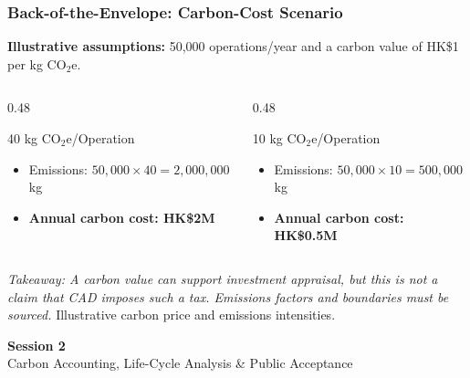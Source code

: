 \documentclass{beamer}
\begin{document}
\begin{frame}[t,shrink=11]
\frametitle{Back-of-the-Envelope: Carbon-Cost Scenario}
\textbf{Illustrative assumptions:} 50,000 operations/year and a carbon value of HK\$1 per kg $\mathrm{CO_2e}$.
\begin{columns}[T]
\begin{column}{0.48\textwidth}\begin{block}{40 kg $\mathrm{CO_2e}$/Operation}
\begin{itemize}
\item Emissions: $50{,}000\times40=2{,}000{,}000$ kg
\item \textbf{Annual carbon cost: HK\$2M}
\end{itemize}\end{block}\end{column}
\begin{column}{0.48\textwidth}\begin{block}{10 kg $\mathrm{CO_2e}$/Operation}
\begin{itemize}
\item Emissions: $50{,}000\times10=500{,}000$ kg
\item \textbf{Annual carbon cost: HK\$0.5M}
\end{itemize}\end{block}\end{column}
\end{columns}
\textit{Takeaway: A carbon value can support investment appraisal, but this is not a claim that CAD imposes such a tax. Emissions factors and boundaries must be sourced.}
\vfill{\tiny Illustrative carbon price and emissions intensities.}
\end{frame}


\begin{frame}[c]
  \begin{center}
    \huge\color{cuhkpurple}\textbf{Session 2}\\
    \vspace{0.5cm}
    \Large Carbon Accounting, Life-Cycle Analysis \& Public Acceptance
  \end{center}
\end{frame}
\end{document}
